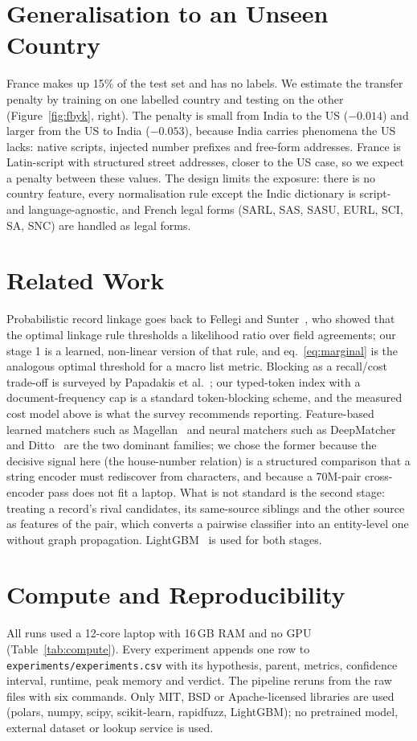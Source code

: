 \documentclass[10pt]{article}
\begin{document}
\section{Generalisation to an Unseen Country}
\label{sec:france}
France makes up 15\% of the test set and has no labels. We estimate the transfer penalty by training on one labelled country and testing on the other (Figure~\ref{fig:fbyk}, right). The penalty is small from India to the US ($-0.014$) and larger from the US to India ($-0.053$), because India carries phenomena the US lacks: native scripts, injected number prefixes and free-form addresses. France is Latin-script with structured street addresses, closer to the US case, so we expect a penalty between these values. The design limits the exposure: there is no country feature, every normalisation rule except the Indic dictionary is script- and language-agnostic, and French legal forms (SARL, SAS, SASU, EURL, SCI, SA, SNC) are handled as legal forms.

\section{Related Work}
Probabilistic record linkage goes back to Fellegi and Sunter~\cite{fellegi}, who showed that the optimal linkage rule thresholds a likelihood ratio over field agreements; our stage 1 is a learned, non-linear version of that rule, and eq.~\ref{eq:marginal} is the analogous optimal threshold for a macro list metric. Blocking as a recall/cost trade-off is surveyed by Papadakis et al.~\cite{papadakis}; our typed-token index with a document-frequency cap is a standard token-blocking scheme, and the measured cost model above is what the survey recommends reporting. Feature-based learned matchers such as Magellan~\cite{magellan} and neural matchers such as DeepMatcher~\cite{deepmatcher} and Ditto~\cite{ditto} are the two dominant families; we chose the former because the decisive signal here (the house-number relation) is a structured comparison that a string encoder must rediscover from characters, and because a 70M-pair cross-encoder pass does not fit a laptop. What is not standard is the second stage: treating a record's rival candidates, its same-source siblings and the other source as features of the pair, which converts a pairwise classifier into an entity-level one without graph propagation. LightGBM~\cite{lightgbm} is used for both stages.

\section{Compute and Reproducibility}
All runs used a 12-core laptop with 16\,GB RAM and no GPU (Table~\ref{tab:compute}). Every experiment appends one row to \texttt{experiments/experiments.csv} with its hypothesis, parent, metrics, confidence interval, runtime, peak memory and verdict. The pipeline reruns from the raw files with six commands. Only MIT, BSD or Apache-licensed libraries are used (polars, numpy, scipy, scikit-learn, rapidfuzz, LightGBM); no pretrained model, external dataset or lookup service is used.
\end{document}
